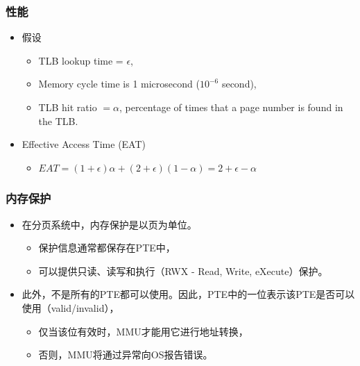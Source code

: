 \documentclass[CJKutf8,xcolor=pdftex,dvipsnames,table]{beamer}
\begin{document}
\begin{CJK*}{UTF8}{song}
  \begin{frame}
  \frametitle{性能} \pause
  \begin{itemize}
  \item{假设} \pause
    \begin{itemize}
    \item{TLB lookup time = $\epsilon$, } \pause
    \item{Memory cycle time is 1 microsecond ($10^{-6}$ second),} \pause
    \item{TLB hit ratio $=\alpha$, percentage of times that a page number is found in the TLB.} \pause
    \end{itemize}
  \item{Effective Access Time (EAT)} \pause
    \begin{itemize}
    \item{$EAT=(1+\epsilon)\alpha+(2+\epsilon)(1-\alpha) = 2+\epsilon-\alpha$}
    \end{itemize}
  \end{itemize}
  \end{frame}
  
  \begin{frame}
  \frametitle{内存保护} \pause
  \begin{itemize}
  \item{在分页系统中，内存保护是以页为单位。} \pause
    \begin{itemize}
    \item{保护信息通常都保存在PTE中，} \pause
    \item{可以提供只读、读写和执行（RWX - Read, Write, eXecute）保护。} \pause
    \end{itemize}
  \item{此外，不是所有的PTE都可以使用。因此，PTE中的一位表示该PTE是否可以使用（valid/invalid），} \pause
    \begin{itemize}
    \item{仅当该位有效时，MMU才能用它进行地址转换，} \pause
    \item{否则，MMU将通过异常向OS报告错误。}
    \end{itemize}
  \end{itemize}
  \end{frame}
  

\end{CJK*}
\end{document}

